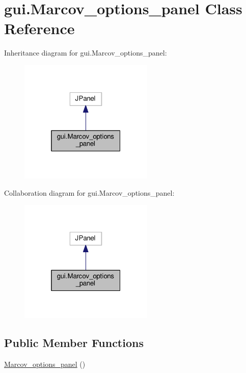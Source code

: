 \hypertarget{classgui_1_1_marcov__options__panel}{}\section{gui.\+Marcov\+\_\+options\+\_\+panel Class Reference}
\label{classgui_1_1_marcov__options__panel}


Inheritance diagram for gui.\+Marcov\+\_\+options\+\_\+panel\+:\nopagebreak
\begin{figure}[H]
\begin{center}
\leavevmode
\includegraphics[width=181pt]{classgui_1_1_marcov__options__panel__inherit__graph}
\end{center}
\end{figure}


Collaboration diagram for gui.\+Marcov\+\_\+options\+\_\+panel\+:\nopagebreak
\begin{figure}[H]
\begin{center}
\leavevmode
\includegraphics[width=181pt]{classgui_1_1_marcov__options__panel__coll__graph}
\end{center}
\end{figure}
\subsection*{Public Member Functions}
\begin{DoxyCompactItemize}
\item 
\hyperlink{classgui_1_1_marcov__options__panel_a00bf246da4a188f42d43c60a243f26ad}{Marcov\+\_\+options\+\_\+panel} ()
\end{DoxyCompactItemize}


